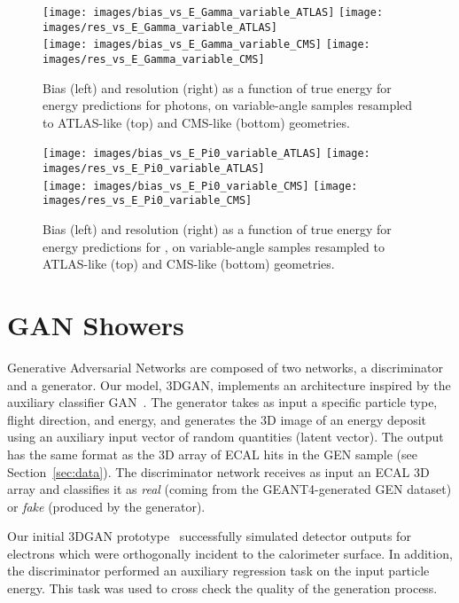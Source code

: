\begin{figure*}[htbp]
\centering
\texttt{[image: images/bias\_vs\_E\_Gamma\_variable\_ATLAS]}
\texttt{[image: images/res\_vs\_E\_Gamma\_variable\_ATLAS]} \\
\texttt{[image: images/bias\_vs\_E\_Gamma\_variable\_CMS]}
\texttt{[image: images/res\_vs\_E\_Gamma\_variable\_CMS]}
\caption{Bias (left) and resolution (right) as a function of true energy for energy predictions for photons, on variable-angle samples resampled to ATLAS-like (top) and CMS-like (bottom) geometries.\label{fig:reg_resampled_gamma_ATLAS_CMS}}
\end{figure*}

\begin{figure*}[htbp]
\centering
\texttt{[image: images/bias\_vs\_E\_Pi0\_variable\_ATLAS]}
\texttt{[image: images/res\_vs\_E\_Pi0\_variable\_ATLAS]} \\
\texttt{[image: images/bias\_vs\_E\_Pi0\_variable\_CMS]}
\texttt{[image: images/res\_vs\_E\_Pi0\_variable\_CMS]}
\caption{Bias (left) and resolution (right) as a function of true energy for energy predictions for \pizero, on variable-angle samples resampled to  ATLAS-like (top) and CMS-like (bottom) geometries.\label{fig:reg_resampled_pi0_ATLAS_CMS}}
\end{figure*}

\chapter{GAN Showers}\label{sec:GAN}

Generative Adversarial Networks are composed of two networks, a discriminator and a generator. Our model, 3DGAN, implements an architecture inspired by the auxiliary classifier GAN~\cite{acgan}. The generator takes as input a specific particle type, flight direction, and energy, and generates the 3D image of an energy deposit using an auxiliary input vector of random quantities (latent vector). 
The output has the same format as the 3D array of ECAL hits in the GEN sample (see Section~\ref{sec:data}). The discriminator network receives as input an ECAL 3D array and classifies it as {\it real} (coming from the GEANT4-generated GEN dataset) or {\it fake} (produced by the generator).

 Our initial 3DGAN prototype~\cite{NIPS} successfully simulated detector outputs for electrons which were orthogonally incident to the calorimeter surface. In addition, the discriminator performed an auxiliary regression task on the input particle energy. This task was used to cross check the quality of the generation process. 
 
